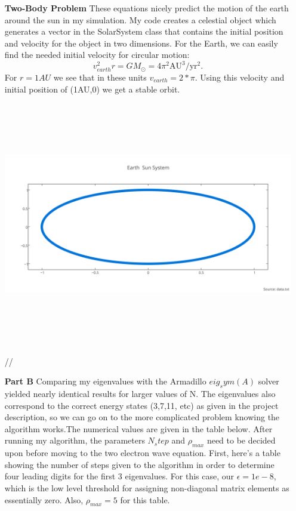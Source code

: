 \documentclass[11pt,a4wide]{article}
\begin{document}
\newpage
\begin{enumerate}
\item[\bf Two-Body Problem]
These equations nicely predict the motion of the earth around the sun in my simulation. My code creates a celestial object which generates a vector in the SolarSystem class that contains the initial position and velocity for the object in two dimensions. For the Earth, we can easily find the needed initial velocity for circular motion: 
\[
v_{earth}^2r=GM_{\odot}=4\pi^2\mathrm{AU}^3/\mathrm{yr}^2.
\]\newline
For $r=1AU$ we see that in these units $v_{earth}=2*\pi$. Using this velocity and initial position of (1AU,0) we get a stable orbit. 
\includegraphics[width=6in,height=4.5in]{earth_sun_system.png}//
\item[\bf Part B]
Comparing my eigenvalues with the Armadillo $eig_sym(A)$ solver yielded nearly identical results for larger values of N. The eigenvalues also correspond to the correct energy states (3,7,11, etc) as given in the project description, so we can go on to the more complicated problem knowing the algorithm works.The numerical values are given in the table below. \newline
After running my algorithm, the parameters $N_step$ and $\rho_{max}$ need to be decided upon before moving to the two electron wave equation. First, here's a table showing the number of steps given to the algorithm in order to determine four leading digits for the first 3 eigenvalues. For this case, our $\epsilon = 1e-8$, which is the low level threshold for assigning non-diagonal matrix elements as essentially zero. Also, $\rho_{max} = 5$ for this table.  

\end{enumerate}
\end{document}
